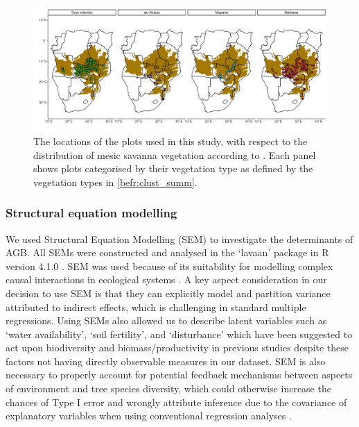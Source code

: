 \begin{refsection}




\begin{landscape}
\begin{figure}
	\includegraphics[width=\linewidth]{img/clust_map}
	\caption[Plot locations used in analysis, grouped by vegetation type]{The locations of the \nplots{} plots used in this study, with respect to the distribution of mesic savanna vegetation according to \citet{White1983}. Each panel shows plots categorised by their vegetation type as defined by the vegetation types in \autoref{befr:clust_summ}.}
	\label{befr:clust_map}
\end{figure}
\end{landscape}

\subsubsection{Structural equation modelling}
\label{befr:sssec:sem}

We used Structural Equation Modelling (SEM) to investigate the determinants of AGB. All SEMs were constructed and analysed in the `lavaan' package \citep{lavaan} in R version 4.1.0 \citep{R2020}. SEM was used because of its suitability for modelling complex causal interactions in ecological systems \citep{Lee2007}. A key aspect consideration in our decision to use SEM is that they can explicitly model and partition variance attributed to indirect effects, which is challenging in standard multiple regressions. Using SEMs also allowed us to describe latent variables such as `water availability', `soil fertility', and `disturbance' which have been suggested to act upon biodiversity and biomass/productivity in previous studies despite these factors not having directly observable measures in our dataset. SEM is also necessary to properly account for potential feedback mechanisms between aspects of environment and tree species diversity, which could otherwise increase the chances of Type I error and wrongly attribute inference due to the covariance of explanatory variables when using conventional regression analyses \citep{Nachtigall2003}.


\end{refsection}
